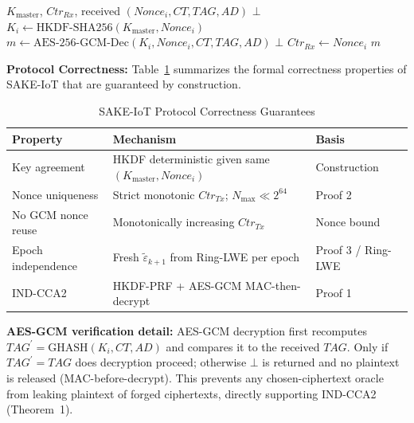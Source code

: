 \documentclass[conference]{IEEEtran}
\newcommand{\Kmaster}{K_{\mathrm{master}}}
\newcommand{\Nmax}{N_{\max}}
\begin{document}
\begin{algorithm}[!t]
\caption{SAKE-Tier2-Receiver}
\label{alg:receiver}
\begin{algorithmic}[1]
\Require $\Kmaster$, $\mathit{Ctr}_{Rx}$, received $(\mathit{Nonce}_i, CT, TAG, AD)$
 
    \State \Return $\bot$ 
\EndIf
\State $K_i \leftarrow \mathrm{HKDF\text{-}SHA256}(\Kmaster, \mathit{Nonce}_i)$
\State $m \leftarrow \mathrm{AES\text{-}256\text{-}GCM\text{-}Dec}(K_i, \mathit{Nonce}_i, CT, TAG, AD)$
    \State \Return $\bot$ 
\EndIf
\State $\mathit{Ctr}_{Rx} \leftarrow \mathit{Nonce}_i$ 
\State \Return $m$
\end{algorithmic}
\end{algorithm}

\noindent\textbf{Protocol Correctness:} Table~\ref{tab:correctness}
summarizes the formal correctness properties of SAKE-IoT that are guaranteed
by construction.

\begin{table}[!t]
\centering
\caption{SAKE-IoT Protocol Correctness Guarantees}
\label{tab:correctness}
\renewcommand{\arraystretch}{1.2}
\begin{tabular}{lll}
\toprule
\textbf{Property} & \textbf{Mechanism} & \textbf{Basis} \\
\midrule
Key agreement & HKDF deterministic given same $(\Kmaster, \mathit{Nonce}_i)$ & Construction \\
Nonce uniqueness & Strict monotonic $\mathit{Ctr}_{Tx}$; $\Nmax \ll 2^{64}$ & Proof 2 \\
No GCM nonce reuse & Monotonically increasing $\mathit{Ctr}_{Tx}$ & Nonce bound \\
Epoch independence & Fresh $\tilde{\varepsilon}_{k+1}$ from Ring-LWE per epoch & Proof 3 / Ring-LWE \\
IND-CCA2 & HKDF-PRF + AES-GCM MAC-then-decrypt & Proof 1 \\
\bottomrule
\end{tabular}
\end{table}

\noindent\textbf{AES-GCM verification detail:} AES-GCM decryption first
recomputes $TAG^{\prime} = \mathrm{GHASH}(K_i, CT, AD)$ and compares it to the
received $TAG$. Only if $TAG^{\prime} = TAG$ does decryption proceed; otherwise
$\bot$ is returned and no plaintext is released (MAC-before-decrypt).
This prevents any chosen-ciphertext oracle from leaking plaintext of forged
ciphertexts, directly supporting IND-CCA2 (Theorem~1).
\end{document}
